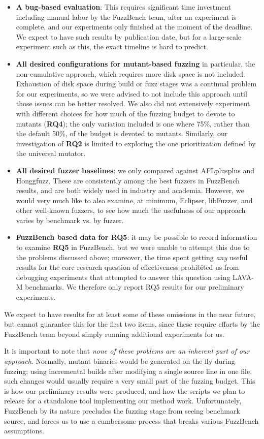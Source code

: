 \begin{itemize}
\item {\bf A bug-based evaluation}:  This requires significant time investment including manual labor by the FuzzBench team, after an experiment is complete, and our experiments only finished at the moment of the deadline.  We expect to have such results by publication date, but for a large-scale experiment such as this, the exact timeline is hard to predict.
\item {\bf All desired configurations for mutant-based fuzzing} in particular, the non-cumulative approach, which requires more disk space is not included.  Exhaustion of disk space during build or fuzz stages was a continual problem for our experiments, so we were advised to not include this approach until those issues can be better resolved.  We also did not extensively experiment with different choices for how much of the fuzzing budget to devote to mutants ({\bf RQ4}); the only variation included is one where 75\%, rather than the default 50\%, of the budget is devoted to mutants.  Similarly, our investigation of {\bf RQ2} is limited to exploring the one prioritization defined by the universal mutator.
\item {\bf All desired fuzzer baselines}: we only compared against AFLplusplus and Honggfuzz.  These are consistently among the  best fuzzers in FuzzBench results, and are both widely used in industry and academia.  However, we would very much like to also examine, at minimum, Eclipser, libFuzzer, and other well-known fuzzers, to see how much the usefulness of our approach varies by benchmark vs. by fuzzer.
  \item {\bf FuzzBench based data for RQ5}: it may be possible to record information to examine {\bf RQ5} in FuzzBench, but we were unable to attempt this due to the problems discussed above; moreover, the time spent getting \emph{any} useful results for the core research question of effectiveness prohibited us from debugging experiments that attempted to answer this question using LAVA-M benchmarks.   We therefore only report RQ5 results for our preliminary experiments.
\end{itemize}

We expect to have results for at least some of these omissions in the near future, but cannot guarantee this for the first two items, since these require efforts by the FuzzBench team beyond simply running additional experiments for us.

It is important to note that \emph{none of these problems are an inherent part of our approach}.  Normally, mutant binaries would be generated on the fly during fuzzing; using incremental builds after modifying a single source line in one file, such changes would usually require a very small part of the fuzzing budget.  This is how our preliminary results were produced, and how the scripts we plan to release for a standalone tool implementing our method work.  Unfortunately, FuzzBench by its nature precludes the fuzzing stage from seeing benchmark source, and forces us to use a cumbersome process that breaks various FuzzBench assumptions.

